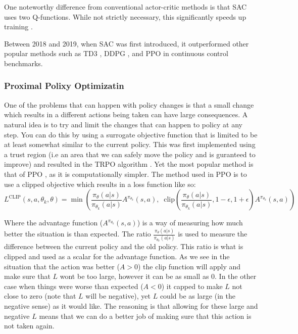 One noteworthy difference from conventional actor-critic methods is that SAC uses two Q-functions. While not strictly necessary, this significantly speeds up training \cite{haarnojaSoftActorCriticAlgorithms2019}.

Between 2018 and 2019, when SAC was first introduced, it outperformed other popular methods such as TD3 \cite{fujimotoAddressingFunctionApproximation2018}, DDPG \cite{lillicrapContinuousControlDeep2019}, and PPO \cite{schulmanProximalPolicyOptimization2017} in continuous control benchmarks.

\subsubsection{Proximal Polixy Optimizatin}\label{subsec:PPO}

One of the problems that can happen with policy changes is that a small change which results in a different actions being taken can have large consequences. A natural idea is to try and limit the changes that can happen to policy at any step. You can do this by using a surrogate objective function that is limited to be at least somewhat similar to the current policy. This was first implemented using a trust region (i.e an area that we can safely move the policy and is guranteed to improve) and resulted in the TRPO algorithm \cite{schulmanTrustRegionPolicy2017}. Yet the most popular method is that of PPO \cite{schulmanProximalPolicyOptimization2017}, as it is computationally simpler. The method used in PPO is to use a clipped objective which results in a loss function like so:
$$
L^{\text{CLIP}}(s,a,\theta_k,\theta) = \min\left(
\frac{\pi_{\theta}(a|s)}{\pi_{\theta_k}(a|s)}  A^{\pi_{\theta_k}}(s,a), \;\;
\text{clip}\left(\frac{\pi_{\theta}(a|s)}{\pi_{\theta_k}(a|s)}, 1 - \epsilon, 1+\epsilon \right) A^{\pi_{\theta_k}}(s,a)
\right)
$$

Where the advantage function ($A^{\pi_{\theta_{k}}}(s,a)$) is a way of measuring how much better the situation is than expected. The ratio $\frac{\pi_{\theta}(a|s)}{\pi_{\theta_{k}}(a|s)}$ is used to measure the difference between the current policy and the old policy. This ratio is what is clipped and used as a scalar for the advantage function. As we see in the situation that the action was better ($A>0$) the clip function will apply and make sure that $L$ wont be too large, however it can be as small as 0. In the other case when things were worse than expected ($A < 0$) it capped to make $L$ not close to zero (note that $L$ will be negative), yet $L$ could be as large (in the negative sense) as it would like. The reasoning is that allowing for these large and negative $L$ means that we can do a better job of making sure that this action is not taken again.

